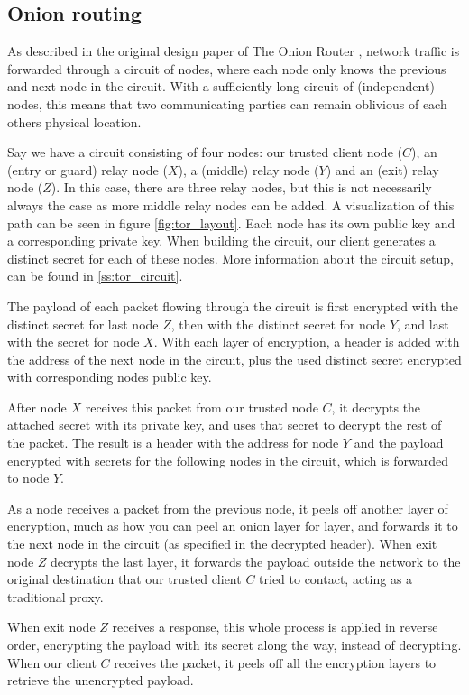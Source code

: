 \documentclass{article}
\begin{document}
	\subsection{Onion routing}
		As described in the original design paper of The Onion Router \cite{goldschlag1996hiding}, network traffic is forwarded through a circuit of nodes, where each node only knows the previous and next node in the circuit. With a sufficiently long circuit of (independent) nodes, this means that two communicating parties can remain oblivious of each others physical location.
		
		Say we have a circuit consisting of four nodes: our trusted client node ($C$), an (entry or guard) relay node ($X$), a (middle) relay node ($Y$) and an (exit) relay node ($Z$). In this case, there are three relay nodes, but this is not necessarily always the case as more middle relay nodes can be added. A visualization of this path can be seen in figure \ref{fig:tor_layout}. Each node has its own public key and a corresponding private key. When building the circuit, our client generates a distinct secret for each of these nodes. More information about the circuit setup, can be found in \ref{ss:tor_circuit}.
		
		The payload of each packet flowing through the circuit is first encrypted with the distinct secret for last node $Z$, then with the distinct secret for node $Y$, and last with the secret for node $X$. With each layer of encryption, a header is added with the address of the next node in the circuit, plus the used distinct secret encrypted with corresponding nodes public key. 
		
		After node $X$ receives this packet from our trusted node $C$, it decrypts the attached secret with its private key, and uses that secret to decrypt the rest of the packet. The result is a header with the address for node $Y$ and the payload encrypted with secrets for the following nodes in the circuit, which is forwarded to node $Y$.
		
		As a node receives a packet from the previous node, it peels off another layer of encryption, much as how you can peel an onion layer for layer, and forwards it to the next node in the circuit (as specified in the decrypted header). When exit node $Z$ decrypts the last layer, it forwards the payload outside the network to the original destination that our trusted client $C$ tried to contact, acting as a traditional proxy.
		
		When exit node $Z$ receives a response, this whole process is applied in reverse order, encrypting the payload with its secret along the way, instead of decrypting. When our client $C$ receives the packet, it peels off all the encryption layers to retrieve the unencrypted payload.
		
\end{document}
